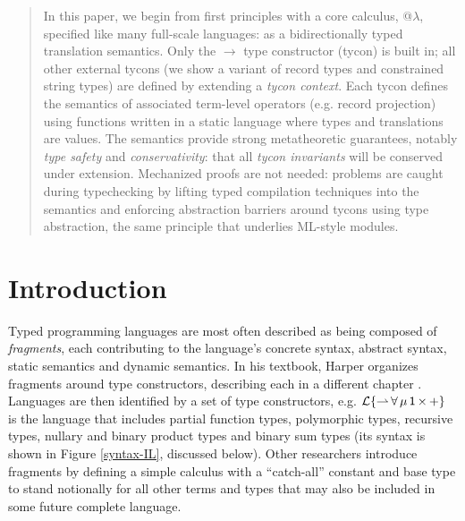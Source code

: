 \documentclass[10pt,preprint]{sigplanconf}
\begin{document}
\begin{abstract}
In this paper, we begin from first principles with a core calculus, @$\lambda$, specified like many full-scale languages: as a bidirectionally typed translation semantics. Only the $\rightarrow$ type constructor (tycon) is built in; all other external tycons (we show a variant of record types and constrained string types) are defined by extending a \emph{tycon context}. Each tycon defines the semantics of associated term-level operators (e.g. record projection) using functions written in a static language where types and translations are values. The semantics provide  strong metatheoretic guarantees, notably \emph{type safety} and \emph{conservativity}: that all \emph{tycon  invariants} will be conserved under extension. Mechanized proofs are not needed: problems are caught during typechecking by lifting typed compilation techniques into the semantics and enforcing abstraction barriers around tycons using type abstraction, the same principle that underlies ML-style modules.
\end{abstract}

\section{Introduction}\label{intro}
Typed programming languages are most often described as being composed of \emph{fragments}, each contributing to the language's concrete syntax, abstract syntax, static semantics and dynamic semantics. 
In his textbook, Harper organizes fragments around type constructors, describing each in a different chapter \cite{pfpl}. Languages are then identified by a set of type constructors, e.g. $\mathcal{L}\{{\rightharpoonup}\,{\forall}\,{\mu}\,{{\sf 1}}\,{\times}\,{+}\}$ is the language that includes partial function types, polymorphic types, recursive types, nullary and binary product types and binary sum types (its syntax is shown in Figure \ref{syntax-IL}, discussed below).
Other researchers introduce fragments by defining a simple calculus with a ``catch-all'' constant and base type to stand notionally for all other terms and types that may also be included in some future complete language.
\end{document}

